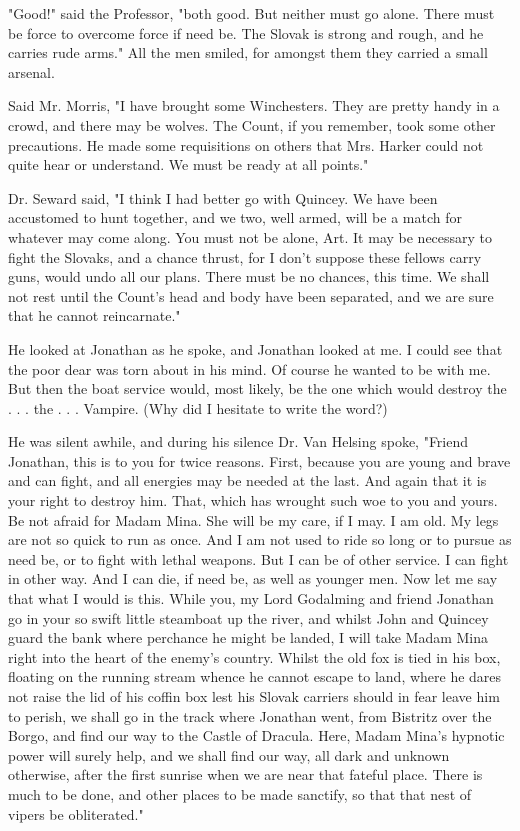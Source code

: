 "Good!" said the Professor, "both good. But neither must go alone. There must be force to overcome force if need be. The Slovak is strong and rough, and he carries rude arms." All the men smiled, for amongst them they carried a small arsenal. 

Said Mr. Morris, "I have brought some Winchesters. They are pretty handy in a crowd, and there may be wolves. The Count, if you remember, took some other precautions. He made some requisitions on others that Mrs. Harker could not quite hear or understand. We must be ready at all points." 

Dr. Seward said, "I think I had better go with Quincey. We have been accustomed to hunt together, and we two, well armed, will be a match for whatever may come along. You must not be alone, Art. It may be necessary to fight the Slovaks, and a chance thrust, for I don't suppose these fellows carry guns, would undo all our plans. There must be no chances, this time. We shall not rest until the Count's head and body have been separated, and we are sure that he cannot reincarnate." 

He looked at Jonathan as he spoke, and Jonathan looked at me. I could see that the poor dear was torn about in his mind. Of course he wanted to be with me. But then the boat service would, most likely, be the one which would destroy the . . . the . . . Vampire. (Why did I hesitate to write the word?) 

He was silent awhile, and during his silence Dr. Van Helsing spoke, "Friend Jonathan, this is to you for twice reasons. First, because you are young and brave and can fight, and all energies may be needed at the last. And again that it is your right to destroy him. That, which has wrought such woe to you and yours. Be not afraid for Madam Mina. She will be my care, if I may. I am old. My legs are not so quick to run as once. And I am not used to ride so long or to pursue as need be, or to fight with lethal weapons. But I can be of other service. I can fight in other way. And I can die, if need be, as well as younger men. Now let me say that what I would is this. While you, my Lord Godalming and friend Jonathan go in your so swift little steamboat up the river, and whilst John and Quincey guard the bank where perchance he might be landed, I will take Madam Mina right into the heart of the enemy's country. Whilst the old fox is tied in his box, floating on the running stream whence he cannot escape to land, where he dares not raise the lid of his coffin box lest his Slovak carriers should in fear leave him to perish, we shall go in the track where Jonathan went, from Bistritz over the Borgo, and find our way to the Castle of Dracula. Here, Madam Mina's hypnotic power will surely help, and we shall find our way, all dark and unknown otherwise, after the first sunrise when we are near that fateful place. There is much to be done, and other places to be made sanctify, so that that nest of vipers be obliterated." 

